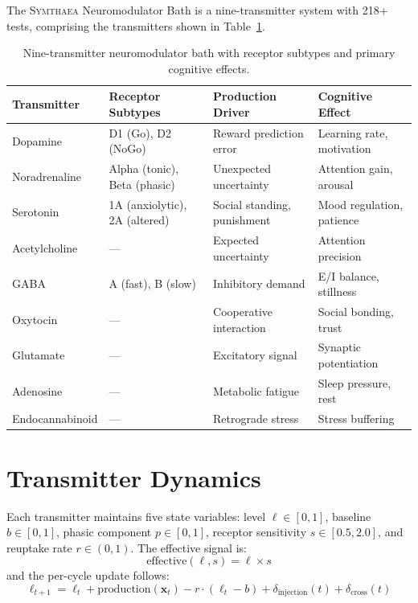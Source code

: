 \documentclass[12pt]{book}
\newcommand{\symthaea}{\textsc{Symthaea}}
\begin{document}
The \symthaea{} Neuromodulator Bath is a nine-transmitter system with 218+ tests, comprising the transmitters shown in Table~\ref{tab:transmitters}.

\begin{table}[H]
\centering
\caption{Nine-transmitter neuromodulator bath with receptor subtypes and primary cognitive effects.}
\label{tab:transmitters}
\begin{tabular}{llll}
\toprule
\textbf{Transmitter} & \textbf{Receptor Subtypes} & \textbf{Production Driver} & \textbf{Cognitive Effect} \\
\midrule
Dopamine & D1 (Go), D2 (NoGo) & Reward prediction error & Learning rate, motivation \\
Noradrenaline & Alpha (tonic), Beta (phasic) & Unexpected uncertainty & Attention gain, arousal \\
Serotonin & 1A (anxiolytic), 2A (altered) & Social standing, punishment & Mood regulation, patience \\
Acetylcholine & --- & Expected uncertainty & Attention precision \\
GABA & A (fast), B (slow) & Inhibitory demand & E/I balance, stillness \\
Oxytocin & --- & Cooperative interaction & Social bonding, trust \\
Glutamate & --- & Excitatory signal & Synaptic potentiation \\
Adenosine & --- & Metabolic fatigue & Sleep pressure, rest \\
Endocannabinoid & --- & Retrograde stress & Stress buffering \\
\bottomrule
\end{tabular}
\end{table}

\section{Transmitter Dynamics}

Each transmitter maintains five state variables: level $\ell \in [0,1]$, baseline $b \in [0,1]$, phasic component $p \in [0,1]$, receptor sensitivity $s \in [0.5, 2.0]$, and reuptake rate $r \in (0,1)$. The effective signal is:
\begin{equation}\label{eq:effective-signal}
\text{effective}(\ell, s) = \ell \times s
\end{equation}
and the per-cycle update follows:
\begin{equation}\label{eq:transmitter-update}
\ell_{t+1} = \ell_t + \text{production}(\mathbf{x}_t) - r \cdot (\ell_t - b) + \delta_{\text{injection}}(t) + \delta_{\text{cross}}(t)
\end{equation}
\end{document}
